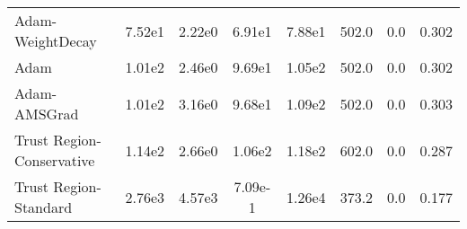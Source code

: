 \documentclass{article}
\begin{document}
\begin{table}[htbp]
{\begin{tabular}{l*{7}{S[table-format=2.2e-1]}}
Adam-WeightDecay & 7.52e1 & 2.22e0 & 6.91e1 & 7.88e1 & 502.0 & 0.0 & 0.302 \\
Adam & 1.01e2 & 2.46e0 & 9.69e1 & 1.05e2 & 502.0 & 0.0 & 0.302 \\
Adam-AMSGrad & 1.01e2 & 3.16e0 & 9.68e1 & 1.09e2 & 502.0 & 0.0 & 0.303 \\
Trust Region-Conservative & 1.14e2 & 2.66e0 & 1.06e2 & 1.18e2 & 602.0 & 0.0 & 0.287 \\
Trust Region-Standard & 2.76e3 & 4.57e3 & 7.09e-1 & 1.26e4 & 373.2 & 0.0 & 0.177 \\
\bottomrule
\end{tabular}
}
\end{table}
\end{document}
